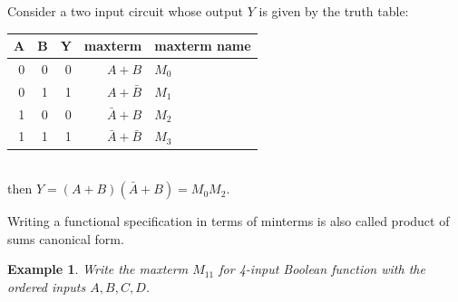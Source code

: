 \documentclass{article}
\newtheorem{example}{Example}
\begin{document}
\noindent Consider a two input circuit whose output $Y$ is given by the truth table:\\
\begin{tabular}{rrrrp{20mm}}
  \toprule
  A & B &  Y & maxterm & maxterm name\\
  \midrule
  0 & 0 &  0 & $A + B$ & $M_0$ \\
  0 & 1 &  1 & $A + \bar{B} $ & $M_1$ \\
  1 & 0 &  0 & $\bar{A} + B$ & $M_2$ \\
  1 & 1 &  1 & $\bar{A} + \bar{B} $ & $M_3$ \\
  \bottomrule
\end{tabular}\\[1em]
then $Y = (A+B)(\bar{A} + B) = M_0M_2$.

\noindent Writing a functional specification in terms of minterms is also called
product of sums canonical form.

\begin{example}
  Write the maxterm $M_{11}$ for 4-input Boolean function with the ordered inputs $A, B, C, D$.
\end{example}

\end{document}
